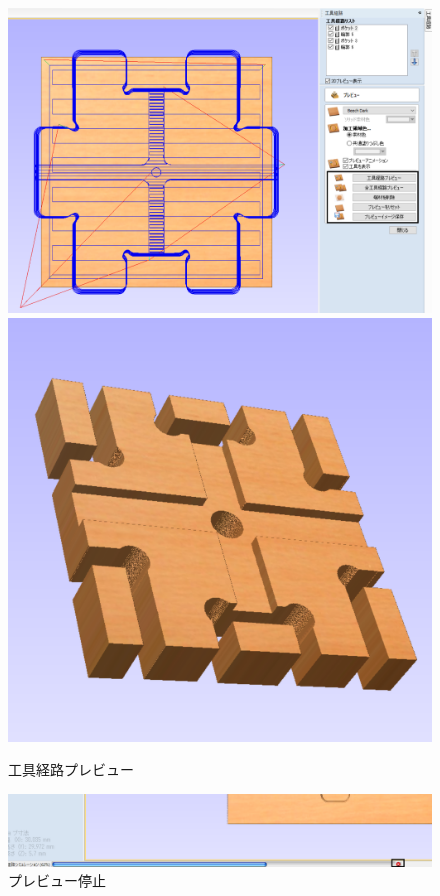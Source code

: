 \documentclass[b5paper, 9pt, twocolumn, titlepage,openany]{jsbook}%
\begin{document}
\begin{figure}[tbh]
  \begin{center}
    \begin{minipage}{0.6\columnwidth}
      \includegraphics[width=\columnwidth]{preview_trim.png}
    \end{minipage}
    \begin{minipage}{0.3\columnwidth}
      \includegraphics[width=\columnwidth]{preview_isome_trim.png}
    \end{minipage}
    \caption{工具経路プレビュー}
    \begin{minipage}{1.0\columnwidth    \label{preview}}
      \includegraphics[width=\columnwidth]{preview_now_trim.png}
    \end{minipage}
    \caption{プレビュー停止    \label{preview_stop}}
  \end{center}
\end{figure}
\end{document}
